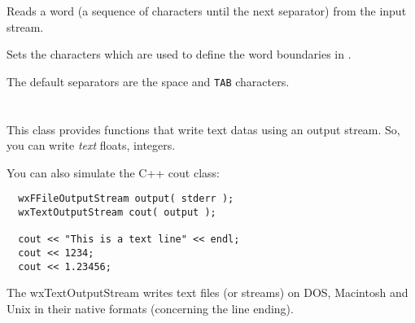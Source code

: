 \label{wxtextinputstreamreadword}


Reads a word (a sequence of characters until the next separator) from the
input stream.



\label{wxtextinputstreamsetstringseparators}


Sets the characters which are used to define the word boundaries in 
.

The default separators are the space and {\tt TAB} characters.


\section{}\label{wxtextoutputstream}

This class provides functions that write text datas using an output stream.
So, you can write {\it text} floats, integers.

You can also simulate the C++ cout class:

\begin{verbatim}
  wxFFileOutputStream output( stderr );
  wxTextOutputStream cout( output );

  cout << "This is a text line" << endl;
  cout << 1234;
  cout << 1.23456;
\end{verbatim}

The wxTextOutputStream writes text files (or streams) on DOS, Macintosh
and Unix in their native formats (concerning the line ending).


\label{wxtextoutputstreamctor}


